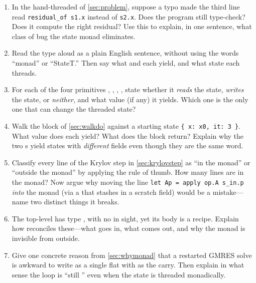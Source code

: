 \exercisessection
\begin{enumerate}[nosep]
  \item In the hand-threaded  of \cref{sec:problem}, suppose a
  typo made the third line read \lstinline[style=l4style]|residual_of s1.x| instead of
  \lstinline[style=l4style]|s2.x|. Does the program still type-check? Does it compute
  the right residual? Use this to explain, in one sentence, what class of bug the state
  monad eliminates.
  \item Read the type  aloud as a plain
  English sentence, without using the words ``monad'' or ``StateT.'' Then say what
   and  each yield, and what state each threads.
  \item For each of the four primitives , , ,
  , state whether it \emph{reads} the state, \emph{writes} the state, or
  \emph{neither}, and what value (if any) it yields. Which one is the only one that can
  change the threaded state?
  \item Walk the  block  of \cref{sec:walkdo} against a starting
  state \lstinline[style=l4style]|{ x: x0, it: 3 }|. What value does each 
  yield? What does the block return? Explain why the two s yield states with
  \emph{different}  fields even though they are the same word.
  \item Classify every line of the Krylov step in \cref{sec:krylovstep} as ``in the
  monad'' or ``outside the monad'' by applying the rule of thumb. How many lines are in
  the monad? Now argue why moving the line \lstinline[style=l4style]|let Ap = apply op.A s_in.p|
  \emph{into} the monad (via a  that stashes  in a scratch field)
  would be a mistake---name two distinct things it breaks.
  \item The top-level  has type , with
  no  in sight, yet its body  is a  recipe.
  Explain how  reconciles these---what goes in, what comes out, and why
  the monad is invisible from outside.
  \item Give one concrete reason from \cref{sec:whymonad} that a restarted GMRES solve
  is awkward to write as a single flat  with  as the
  carry. Then explain in what sense the loop is ``still '' even when
  the state is threaded monadically.

\end{enumerate}
